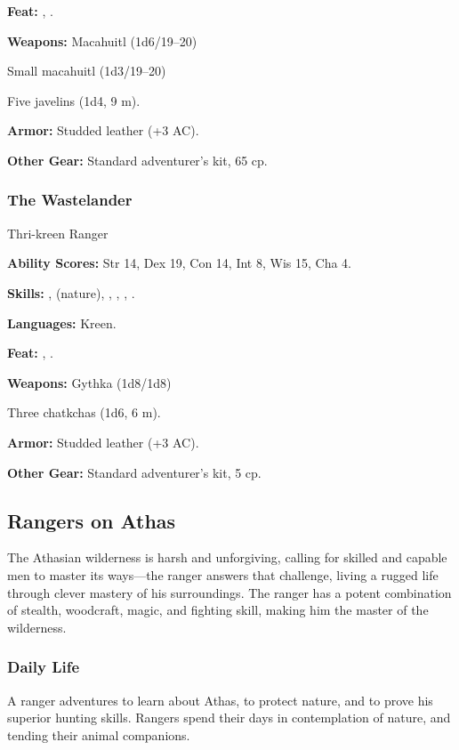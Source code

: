 \textbf{Feat:} , .

\textbf{Weapons:} Macahuitl (1d6/19--20)

Small macahuitl (1d3/19--20)

Five javelins (1d4, 9 m).

\textbf{Armor:} Studded leather (+3 AC).

\textbf{Other Gear:} Standard adventurer's kit, 65 cp.

\subsubsection{The Wastelander}
Thri-kreen Ranger

\textbf{Ability Scores:} Str 14, Dex 19, Con 14, Int 8, Wis 15, Cha 4.

\textbf{Skills:} ,  (nature), , , , .

\textbf{Languages:} Kreen.

\textbf{Feat:} , .

\textbf{Weapons:} Gythka (1d8/1d8)

Three chatkchas (1d6, 6 m).

\textbf{Armor:} Studded leather (+3 AC).

\textbf{Other Gear:} Standard adventurer's kit, 5 cp.

\subsection{Rangers on Athas}

The Athasian wilderness is harsh and unforgiving, calling for skilled and capable men to master its ways---the ranger answers that challenge, living a rugged life through clever mastery of his surroundings. The ranger has a potent combination of stealth, woodcraft, magic, and fighting skill, making him the master of the wilderness.

\subsubsection{Daily Life}

A ranger adventures to learn about Athas, to protect nature, and to prove his superior hunting skills. Rangers spend their days in contemplation of nature, and tending their animal companions.


